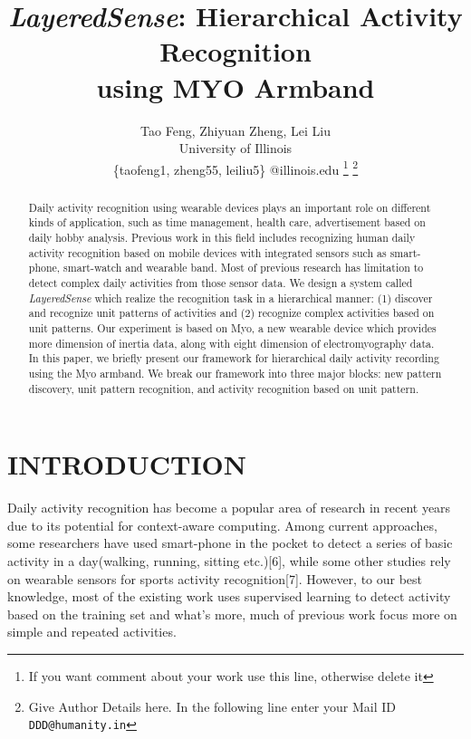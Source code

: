 \documentclass[a4paper, 10pt, conference]{IEEEtran}      %
\title{\LARGE \bf \emph{LayeredSense}: Hierarchical Activity Recognition \\using MYO Armband}
\author{Tao Feng, Zhiyuan Zheng, Lei Liu \\ University of Illinois \\ \{taofeng1, zheng55, leiliu5\} @illinois.edu
\thanks{If you want comment about your work use this line, otherwise delete it}
\thanks{Give Author Details here. In the following line enter your Mail ID 
                  {\tt\small DDD@humanity.in}}
}
\begin{document}
\maketitle
\thispagestyle{empty}
\pagestyle{empty}



\begin{abstract}


Daily activity recognition using wearable devices plays an important role on different kinds of application, such as time management, health care, advertisement based on daily hobby analysis. Previous work in this field includes recognizing human daily activity recognition based on mobile devices with integrated sensors such as smart-phone, smart-watch and wearable band. Most of previous research has limitation to detect complex daily activities from those sensor data. We design a system called \emph{LayeredSense} which realize the recognition task in a hierarchical manner: (1) discover and recognize unit patterns of activities and (2) recognize complex activities based on unit patterns. Our experiment is based on Myo, a new wearable device which provides more dimension of inertia data, along with eight dimension of electromyography data. In this paper, we briefly present our framework for hierarchical daily activity recording using the Myo armband. We break our framework into three major blocks: new pattern discovery, unit pattern recognition, and activity recognition based on unit pattern. 

\end{abstract}



\section{INTRODUCTION}

Daily activity recognition has become a popular area of research in recent years due to its potential for context-aware computing. Among current approaches, some researchers have used smart-phone in the pocket to detect a series of basic activity in a day(walking, running, sitting etc.)[6], while some other studies rely on wearable sensors for sports activity recognition[7]. However, to our best knowledge, most of the existing work uses supervised learning to detect activity based on the training set and what's more, much of previous work focus more on simple and repeated activities. 
\end{document}
